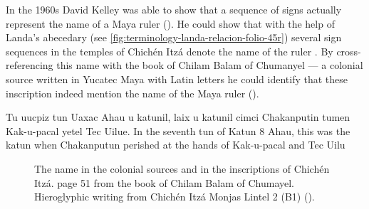 \documentclass[../main.tex]{subfiles}
\begin{document}

In the 1960s David Kelley was able to show that a sequence of signs actually represent the name
of a Maya ruler (\cite{kelley1962a}).
He could show that with the help of Landa's abecedary 
(see \ref{fig:terminology-landa-relacion-folio-45r}) several sign sequences in the temples of
Chich\'{e}n Itz\'{a} denote the name of the ruler .
By cross-referencing this name with the book of Chilam Balam of Chumanyel --- a colonial source
written in Yucatec Maya with Latin letters he could identify that these inscription indeed
mention the name of the Maya ruler (\cite{kelley1968}).

Tu uucpiz tun Uaxac Ahau u katunil, laix u katunil cimci Chakanputin tumen Kak-u-pacal yetel Tec Uilue.
In the seventh tun of Katun 8 Ahau, this was the katun when Chakanputun perished at the hands of Kak-u-pacal and Tec Uilu

\cite[51,141]{roys1933}

\begin{figure}
    \centering
    \caption[K\glottalstop{}ak\glottalstop{}upakal in the colonial sources and inscriptions]
             {The name  in the colonial sources and 
             in the inscriptions of Chich\'{e}n Itz\'{a}.
              page 51 from the book of 
             Chilam Balam of Chumayel.
             Hieroglyphic writing from Chich\'{e}n Itz\'{a} Monjas Lintel 2 (B1) (\authordrawings).}
\end{figure}
\end{document}
